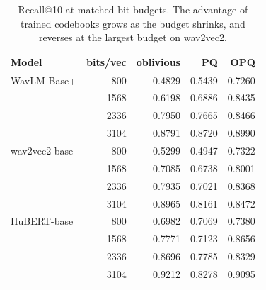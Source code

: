\begin{table}[t]
\centering
\caption{Recall@10 at matched bit budgets. The advantage of trained codebooks grows as the budget shrinks, and reverses at the largest budget on wav2vec2.}
\label{tab:rq1}
\begin{tabular}{lrrrr}
\toprule
Model & bits/vec & oblivious & PQ & OPQ \\
\midrule
WavLM-Base+ & 800 & 0.4829 & 0.5439 & 0.7260 \\
 & 1568 & 0.6198 & 0.6886 & 0.8435 \\
 & 2336 & 0.7950 & 0.7665 & 0.8466 \\
 & 3104 & 0.8791 & 0.8720 & 0.8990 \\
\midrule
wav2vec2-base & 800 & 0.5299 & 0.4947 & 0.7322 \\
 & 1568 & 0.7085 & 0.6738 & 0.8001 \\
 & 2336 & 0.7935 & 0.7021 & 0.8368 \\
 & 3104 & 0.8965 & 0.8161 & 0.8472 \\
\midrule
HuBERT-base & 800 & 0.6982 & 0.7069 & 0.7380 \\
 & 1568 & 0.7771 & 0.7123 & 0.8656 \\
 & 2336 & 0.8696 & 0.7785 & 0.8329 \\
 & 3104 & 0.9212 & 0.8278 & 0.9095 \\
\bottomrule
\end{tabular}
\end{table}